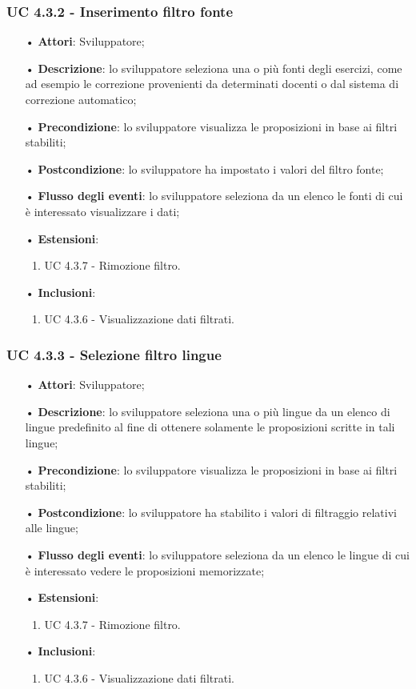 \subsubsection{UC 4.3.2 - Inserimento filtro fonte}
\begin{itemize}
	\item[•]\textbf{Attori}: Sviluppatore;
	\item[•]\textbf{Descrizione}: lo sviluppatore seleziona una o più fonti degli esercizi, come ad esempio le correzione provenienti da determinati docenti o dal sistema di correzione automatico;
	\item[•]\textbf{Precondizione}: lo sviluppatore visualizza le proposizioni in base ai filtri stabiliti;
	\item[•]\textbf{Postcondizione}: lo sviluppatore ha impostato i valori del filtro fonte;
	\item[•]\textbf{Flusso degli eventi}: lo sviluppatore seleziona da un elenco le fonti di cui è interessato visualizzare i dati;
	\item[•]\textbf{Estensioni}: 
	\begin{enumerate}
		\item UC 4.3.7 - Rimozione filtro.
	\end{enumerate}
	\item[•]\textbf{Inclusioni}:
	\begin{enumerate}
		\item UC 4.3.6 - Visualizzazione dati filtrati.
	\end{enumerate}
\end{itemize}

\subsubsection{UC 4.3.3 -  Selezione filtro lingue}
\begin{itemize}
	\item[•]\textbf{Attori}: Sviluppatore;
	\item[•]\textbf{Descrizione}: lo sviluppatore seleziona una o più lingue da un elenco di lingue predefinito al fine di ottenere solamente le proposizioni scritte in tali lingue;
	\item[•]\textbf{Precondizione}: lo sviluppatore visualizza le proposizioni in base ai filtri stabiliti;
	\item[•]\textbf{Postcondizione}: lo sviluppatore ha stabilito i valori di filtraggio relativi alle lingue;
	\item[•]\textbf{Flusso degli eventi}: lo sviluppatore seleziona da un elenco le lingue di cui è interessato vedere le proposizioni memorizzate;
	\item[•]\textbf{Estensioni}: 
	\begin{enumerate}
		\item UC 4.3.7 - Rimozione filtro.
	\end{enumerate}
	\item[•]\textbf{Inclusioni}:
	\begin{enumerate}
		\item UC 4.3.6 - Visualizzazione dati filtrati.
	\end{enumerate}
\end{itemize}


